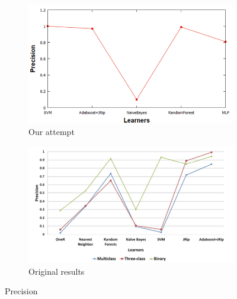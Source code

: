 \begin{figure}[H]
    \centering
    \begin{subfigure}[t]{0.5\textwidth}
        \includegraphics[width=\linewidth]{images/weka_precision.png}
        \caption{Our attempt}
    \end{subfigure}%
    \begin{subfigure}[t]{0.5\textwidth}
        \includegraphics[width=\linewidth]{images/weka_precision_cite.png}
        \caption{Original results \cite{borges_hink_machine_2014-1}}
    \end{subfigure}
    \caption{Precision}
    \label{fig:weka_prec}
\end{figure}

